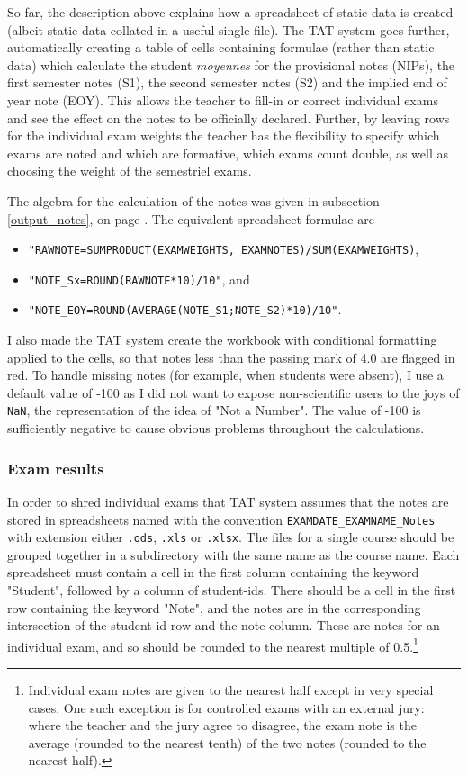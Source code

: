 \documentclass[10pt]{article}
\begin{document}
So far, the description above explains how a spreadsheet of static data is created (albeit static data collated in a useful single file). The TAT system goes further, automatically creating a table of cells containing formulae (rather than static data) which calculate the student \emph{moyennes} for the provisional notes (NIPs), the first semester notes (S1), the second semester notes (S2) and the implied end of year note (EOY). This allows the teacher to fill-in or correct individual exams and see the effect on the notes to be officially declared. Further, by leaving rows for the individual exam weights the teacher has the flexibility to specify which exams are noted and which are formative, which exams count double, as well as choosing the weight of the semestriel exams.

The algebra for the calculation of the notes was given in subsection \ref{output_notes}, on page \pageref{output_notes}. The equivalent spreadsheet formulae are 
\begin{itemize}
\item \texttt{"RAWNOTE=SUMPRODUCT(EXAMWEIGHTS, EXAMNOTES)/SUM(EXAMWEIGHTS)},
\item \texttt{"NOTE\_Sx=ROUND(RAWNOTE*10)/10"}, and
\item \texttt{"NOTE\_EOY=ROUND(AVERAGE(NOTE\_S1;NOTE\_S2)*10)/10"}.
\end{itemize}

I also made the TAT system create the workbook with conditional formatting applied to the cells, so that notes less than the passing mark of 4.0 are flagged in red. To handle missing notes (for example, when students were absent), I use a default value of -100 as I did not want to expose non-scientific users to the joys of \texttt{NaN}, the representation of the idea of "Not a Number". The value of -100 is sufficiently negative to cause obvious problems throughout the calculations.

\subsubsection{Exam results}
In order to shred individual exams that TAT system assumes that the notes are stored in spreadsheets named with the convention \texttt{EXAMDATE\_EXAMNAME\_Notes} with extension either \texttt{.ods}, \texttt{.xls} or \texttt{.xlsx}. The files for a single course should be grouped together in a subdirectory with the same name as the course name. Each spreadsheet must contain a cell in the first column containing the keyword "Student", followed by a column of student-ids. There should be a cell in the first row containing the keyword "Note", and the notes are in the corresponding intersection of the student-id row and the note column. These are notes for an individual exam, and so should be rounded to the nearest multiple of 0.5.\footnote{Individual exam notes are given to the nearest half except in very special cases. One such exception is for controlled exams with an external jury: where the teacher and the jury agree to disagree, the exam note is the average (rounded to the nearest tenth) of the two notes (rounded to the nearest half).}
\end{document}
